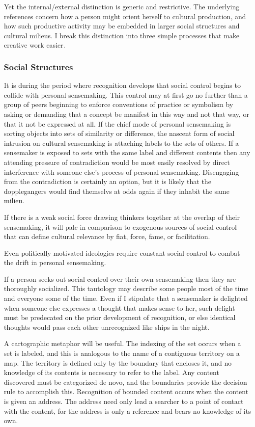 \documentclass [PhD] {uclathes}
\begin{document}
Yet the internal/external distinction is generic and restrictive. The
underlying references concern how a person might orient herself to
cultural production, and how such productive activity may be embedded in
larger social structures and cultural milieus. I break this distinction
into three simple processes that make creative work easier.

\subsubsection{Social Structures}\label{social-structures}

It is during the period where recognition develops that social control
begins to collide with personal sensemaking. This control may at first
go no further than a group of peers beginning to enforce conventions of
practice or symbolism by asking or demanding that a concept be manifest
in this way and not that way, or that it not be expressed at all. If the
chief mode of personal sensemaking is sorting objects into sets of
similarity or difference, the nascent form of social intrusion on
cultural sensemaking is attaching labels to the sets of others. If a
sensemaker is exposed to sets with the same label and different contents
then any attending pressure of contradiction would be most easily
resolved by direct interference with someone else's process of personal
sensemaking. Disengaging from the contradiction is certainly an option,
but it is likely that the dopplegangers would find themselvs at odds
again if they inhabit the same milieu.

If there is a weak social force drawing thinkers together at the overlap
of their sensemaking, it will pale in comparison to exogenous sources of
social control that can define cultural relevance by fiat, force, fame,
or facilitation.

Even politically motivated ideologies require constant social control to
combat the drift in personal sensemaking.

If a person seeks out social control over their own sensemaking then
they are thoroughly socialized. This tautology may describe some people
most of the time and everyone some of the time. Even if I stipulate that
a sensemaker is delighted when someone else expresses a thought that
makes sense to her, such delight must be predecated on the prior
development of recognition, or else identical thoughts would pass each
other unrecognized like ships in the night.

A cartographic metaphor will be useful. The indexing of the set occurs
when a set is labeled, and this is analogous to the name of a contiguous
territory on a map. The territory is defined only by the boundary that
encloses it, and no knowledge of its contents is necessary to refer to
the label. Any content discovered must be categorized de novo, and the
boundaries provide the decision rule to accomplish this. Recognition of
bounded content occurs when the content is given an address. The address
need only lead a searcher to a point of contact with the content, for
the address is only a reference and bears no knowledge of its own.
\end{document}
